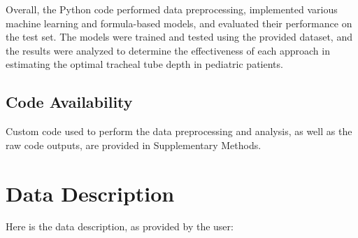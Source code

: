 \documentclass[11pt]{article}
\begin{document}
Overall, the Python code performed data preprocessing, implemented various machine learning and formula-based models, and evaluated their performance on the test set. The models were trained and tested using the provided dataset, and the results were analyzed to determine the effectiveness of each approach in estimating the optimal tracheal tube depth in pediatric patients.\subsection*{Code Availability}

Custom code used to perform the data preprocessing and analysis, as well as the raw code outputs, are provided in Supplementary Methods.


\clearpage
\appendix

\section{Data Description} \label{sec:data_description} Here is the data description, as provided by the user:
\end{document}
